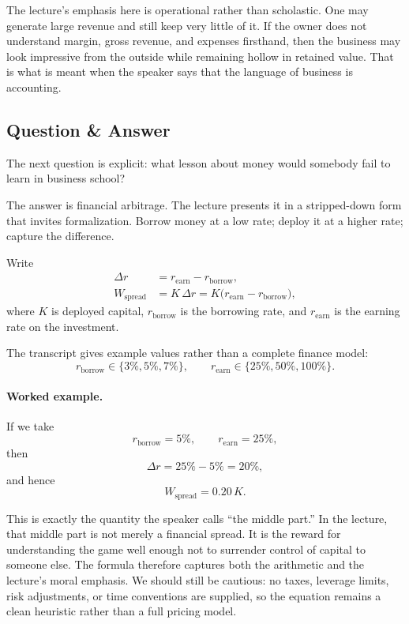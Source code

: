 The lecture's emphasis here is operational rather than scholastic. One may generate large revenue and still keep very little of it. If the owner does not understand margin, gross revenue, and expenses firsthand, then the business may look impressive from the outside while remaining hollow in retained value. That is what is meant when the speaker says that the language of business is accounting.

\subsection{Question \& Answer}

The next question is explicit: what lesson about money would somebody fail to learn in business school?

The answer is financial arbitrage. The lecture presents it in a stripped-down form that invites formalization. Borrow money at a low rate; deploy it at a higher rate; capture the difference.

Write
\begin{align}
\Delta r &= r_{\text{earn}} - r_{\text{borrow}},\\
W_{\text{spread}} &= K\,\Delta r = K\bigl(r_{\text{earn}} - r_{\text{borrow}}\bigr),
\end{align}
where \(K\) is deployed capital, \(r_{\text{borrow}}\) is the borrowing rate, and \(r_{\text{earn}}\) is the earning rate on the investment.

The transcript gives example values rather than a complete finance model:
\[
r_{\text{borrow}} \in \{3\%,5\%,7\%\},\qquad
r_{\text{earn}} \in \{25\%,50\%,100\%\}.
\]

\paragraph{Worked example.}
If we take
\[
r_{\text{borrow}} = 5\%,\qquad r_{\text{earn}} = 25\%,
\]
then
\[
\Delta r = 25\% - 5\% = 20\%,
\]
and hence
\[
W_{\text{spread}} = 0.20\,K.
\]

This is exactly the quantity the speaker calls ``the middle part.'' In the lecture, that middle part is not merely a financial spread. It is the reward for understanding the game well enough not to surrender control of capital to someone else. The formula therefore captures both the arithmetic and the lecture's moral emphasis. We should still be cautious: no taxes, leverage limits, risk adjustments, or time conventions are supplied, so the equation remains a clean heuristic rather than a full pricing model.

